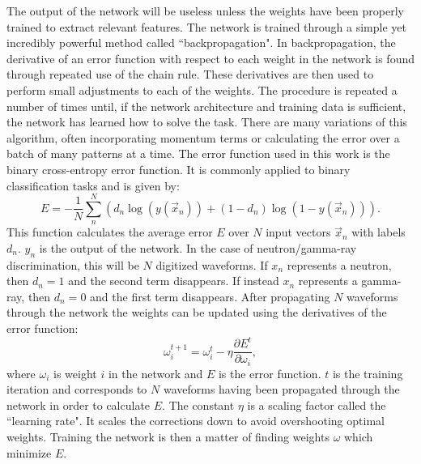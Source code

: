 \documentclass[main.tex]{subfiles}
\begin{document}
The output of the network will be useless unless the weights have been properly trained to extract relevant features. The network is trained through a simple yet incredibly powerful method called ``backpropagation". In backpropagation, the derivative of an error function with respect to each weight in the network is found through repeated use of the chain rule. These derivatives are then used to perform small adjustments to each of the weights. The procedure is repeated a number of times until, if the network architecture and training data is sufficient, the network has learned how to solve the task. There are many variations of this algorithm, often incorporating momentum terms or calculating the error over a batch of many patterns at a time.
The error function used in this work is the binary cross-entropy error function. It is commonly applied to binary classification tasks and is given by:
\begin{equation}
	E = -\frac{1}{N}\sum_n^N\left(	d_n\log(y(\vec x_n))+(1-d_n)\log(1-y(\vec x_n))	\right).
\end{equation}
This function calculates the average error $E$ over $N$ input vectors $\vec x_n$ with labels $d_n$. $y_n$ is the output of the network. In the case of neutron/gamma-ray discrimination, this will be $N$ digitized waveforms. If $x_n$ represents a neutron, then $d_n=1$ and the second term disappears. If instead $x_n$ represents a gamma-ray, then $d_n=0$ and the first term disappears.
After propagating $N$ waveforms through the network the weights can be updated using the derivatives of the error function:
\begin{equation}
	\omega^{t+1}_i = \omega^{t}_i - \eta\frac{\partial E^t}{\partial \omega_i},
\end{equation}
where $\omega_i$ is weight $i$ in the network and $E$ is the error function. $t$ is the training iteration and corresponds to $N$ waveforms having been propagated through the network in order to calculate $E$. The constant $\eta$ is a scaling factor called the ``learning rate". It scales the corrections down to avoid overshooting optimal weights. Training the network is then a matter of finding weights $\omega$ which minimize $E$.
\end{document}
